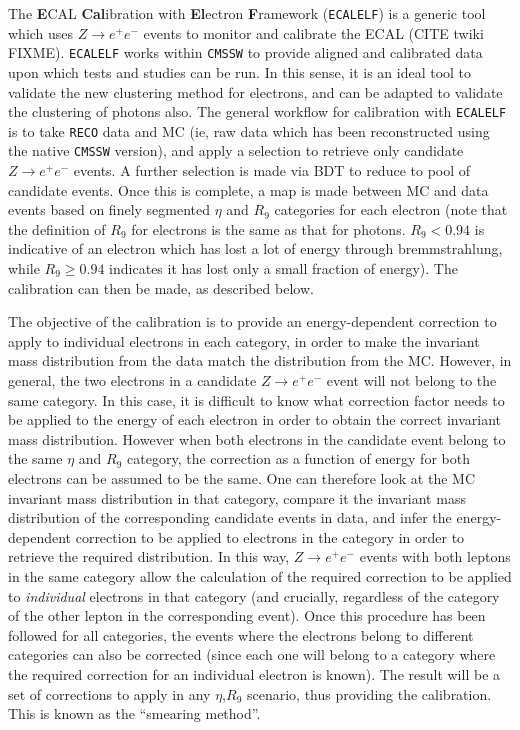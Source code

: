 \documentclass[10pt]{article}
\begin{document}
The \textbf{E}CAL \textbf{Cal}ibration with \textbf{El}ectron \textbf{F}ramework (\texttt{ECALELF}) is a generic tool which uses $Z \rightarrow e^+ e^-$ events to monitor and calibrate the ECAL (CITE twiki FIXME). \texttt{ECALELF} works within \texttt{CMSSW} to provide aligned and calibrated data upon which tests and studies can be run. In this sense, it is an ideal tool to validate the new clustering method for electrons, and can be adapted to validate the clustering of photons also. The general workflow for calibration with \texttt{ECALELF} is to take \texttt{RECO} data and MC (ie, raw data which has been reconstructed using the native \texttt{CMSSW} version), and apply a selection to retrieve only candidate $Z \rightarrow e^+ e^-$ events. A further selection is made via BDT to reduce to pool of candidate events. Once this is complete, a map is made between MC and data events based on finely segmented $\eta$ and $R_9$ categories for each electron (note that the definition of $R_9$ for electrons is the same as that for photons. $R_9 < 0.94$ is indicative of an electron which has lost a lot of energy through bremmstrahlung, while $R_9 \geq 0.94$ indicates it has lost only a small fraction of energy). The calibration can then be made, as described below.

The objective of the calibration is to provide an energy-dependent correction to apply to individual electrons in each category, in order to make the invariant mass distribution from the data match the distribution from the MC. However, in general, the two electrons in a candidate $Z \rightarrow e^+ e^-$ event will not belong to the same category. In this case, it is difficult to know what correction factor needs to be applied to the energy of each electron in order to obtain the correct invariant mass distribution. However when both electrons in the candidate event belong to the same $\eta$ and $R_9$ category, the correction as a function of energy for both electrons can be assumed to be the same. One can therefore look at the MC invariant mass distribution in that category, compare it the invariant mass distribution of the corresponding candidate events in data, and infer the energy-dependent correction to be applied to electrons in the category in order to retrieve the required distribution. In this way, $Z \rightarrow e^+ e^-$ events with both leptons in the same category allow the calculation of the required correction to be applied to \textit{individual} electrons in that category (and crucially, regardless of the category of the other lepton in the corresponding event). Once this procedure has been followed for all categories, the events where the electrons belong to different categories can also be corrected (since each one will belong to a category where the required correction for an individual electron is known). The result will be a set of corrections to apply in any $\eta$,$R_9$ scenario, thus providing the calibration. This is known as the ``smearing method''.
\end{document}
